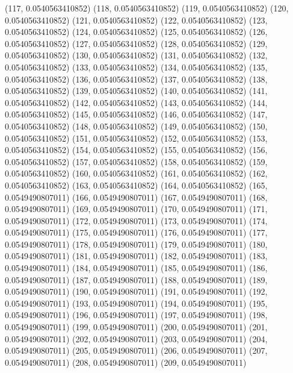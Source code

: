 {					(117, 0.0540563410852)
					(118, 0.0540563410852)
					(119, 0.0540563410852)
					(120, 0.0540563410852)
					(121, 0.0540563410852)
					(122, 0.0540563410852)
					(123, 0.0540563410852)
					(124, 0.0540563410852)
					(125, 0.0540563410852)
					(126, 0.0540563410852)
					(127, 0.0540563410852)
					(128, 0.0540563410852)
					(129, 0.0540563410852)
					(130, 0.0540563410852)
					(131, 0.0540563410852)
					(132, 0.0540563410852)
					(133, 0.0540563410852)
					(134, 0.0540563410852)
					(135, 0.0540563410852)
					(136, 0.0540563410852)
					(137, 0.0540563410852)
					(138, 0.0540563410852)
					(139, 0.0540563410852)
					(140, 0.0540563410852)
					(141, 0.0540563410852)
					(142, 0.0540563410852)
					(143, 0.0540563410852)
					(144, 0.0540563410852)
					(145, 0.0540563410852)
					(146, 0.0540563410852)
					(147, 0.0540563410852)
					(148, 0.0540563410852)
					(149, 0.0540563410852)
					(150, 0.0540563410852)
					(151, 0.0540563410852)
					(152, 0.0540563410852)
					(153, 0.0540563410852)
					(154, 0.0540563410852)
					(155, 0.0540563410852)
					(156, 0.0540563410852)
					(157, 0.0540563410852)
					(158, 0.0540563410852)
					(159, 0.0540563410852)
					(160, 0.0540563410852)
					(161, 0.0540563410852)
					(162, 0.0540563410852)
					(163, 0.0540563410852)
					(164, 0.0540563410852)
					(165, 0.0549490807011)
					(166, 0.0549490807011)
					(167, 0.0549490807011)
					(168, 0.0549490807011)
					(169, 0.0549490807011)
					(170, 0.0549490807011)
					(171, 0.0549490807011)
					(172, 0.0549490807011)
					(173, 0.0549490807011)
					(174, 0.0549490807011)
					(175, 0.0549490807011)
					(176, 0.0549490807011)
					(177, 0.0549490807011)
					(178, 0.0549490807011)
					(179, 0.0549490807011)
					(180, 0.0549490807011)
					(181, 0.0549490807011)
					(182, 0.0549490807011)
					(183, 0.0549490807011)
					(184, 0.0549490807011)
					(185, 0.0549490807011)
					(186, 0.0549490807011)
					(187, 0.0549490807011)
					(188, 0.0549490807011)
					(189, 0.0549490807011)
					(190, 0.0549490807011)
					(191, 0.0549490807011)
					(192, 0.0549490807011)
					(193, 0.0549490807011)
					(194, 0.0549490807011)
					(195, 0.0549490807011)
					(196, 0.0549490807011)
					(197, 0.0549490807011)
					(198, 0.0549490807011)
					(199, 0.0549490807011)
					(200, 0.0549490807011)
					(201, 0.0549490807011)
					(202, 0.0549490807011)
					(203, 0.0549490807011)
					(204, 0.0549490807011)
					(205, 0.0549490807011)
					(206, 0.0549490807011)
					(207, 0.0549490807011)
					(208, 0.0549490807011)
					(209, 0.0549490807011)
}
